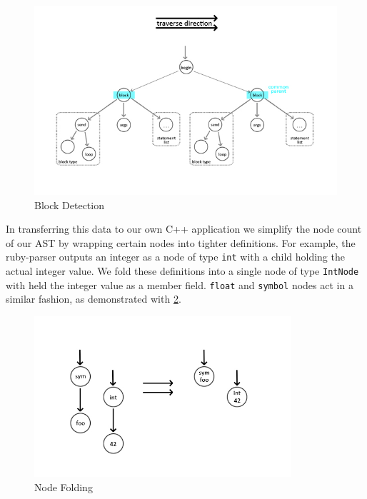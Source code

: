 \documentclass[11pt, abstracton, twoside, titlepage=true]{scrartcl}
\begin{document}
\begin{figure}[h!]
	\centering
	\includegraphics[width=\textwidth]{images/BlkDetection.jpg}
	\caption{Block Detection} \label{blockdetect}
\end{figure}
\vspace{15pt}
In transferring this data to our own C++ application we simplify the node count of 
our AST by wrapping certain nodes into 
tighter definitions. For example, the ruby-parser outputs an integer as a node 
of type \texttt{int} with a child holding the actual integer value. We fold these 
definitions into a single node of type \texttt{IntNode} with held the integer value 
as a member field. \texttt{float} and \texttt{symbol} nodes act in a similar
fashion, as demonstrated with \ref{symwrap}.

\begin{figure}[h!]
	\centering
	\includegraphics[width=0.85\textwidth]{images/SymInt.jpg}
	\caption{Node Folding} \label{symwrap}
\end{figure}
\end{document}
